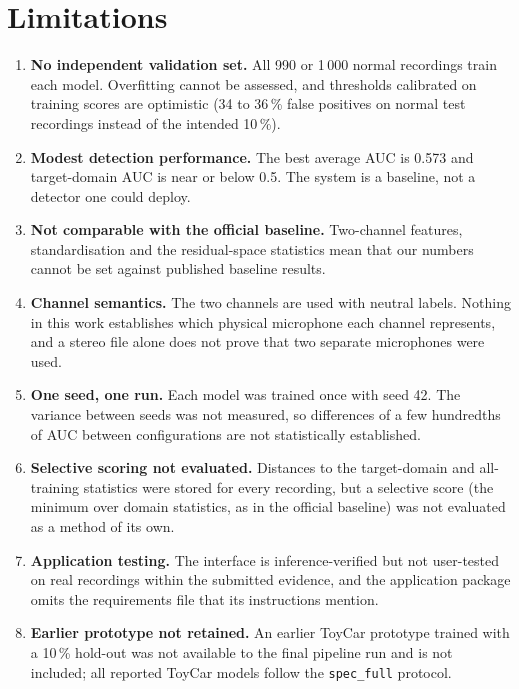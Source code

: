 \section{Limitations}
\begin{enumerate}
  \item \textbf{No independent validation set.} All 990 or 1\,000 normal recordings train each model. Overfitting cannot be assessed, and thresholds calibrated on training scores are optimistic (34 to 36\,\% false positives on normal test recordings instead of the intended 10\,\%).
  \item \textbf{Modest detection performance.} The best average AUC is 0.573 and target-domain AUC is near or below 0.5. The system is a baseline, not a detector one could deploy.
  \item \textbf{Not comparable with the official baseline.} Two-channel features, standardisation and the residual-space statistics mean that our numbers cannot be set against published baseline results.
  \item \textbf{Channel semantics.} The two channels are used with neutral labels. Nothing in this work establishes which physical microphone each channel represents, and a stereo file alone does not prove that two separate microphones were used.
  \item \textbf{One seed, one run.} Each model was trained once with seed 42. The variance between seeds was not measured, so differences of a few hundredths of AUC between configurations are not statistically established.
  \item \textbf{Selective scoring not evaluated.} Distances to the target-domain and all-training statistics were stored for every recording, but a selective score (the minimum over domain statistics, as in the official baseline) was not evaluated as a method of its own.
  \item \textbf{Application testing.} The interface is inference-verified but not user-tested on real recordings within the submitted evidence, and the application package omits the requirements file that its instructions mention.
  \item \textbf{Earlier prototype not retained.} An earlier ToyCar prototype trained with a 10\,\% hold-out was not available to the final pipeline run and is not included; all reported ToyCar models follow the \texttt{spec\_full} protocol.
\end{enumerate}
